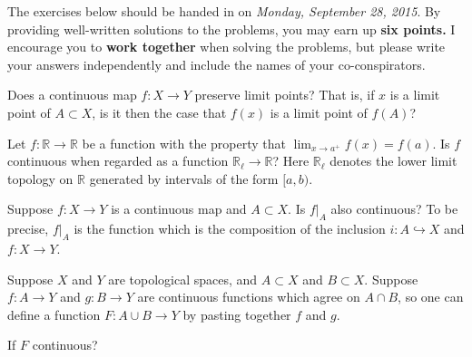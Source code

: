 \documentclass[12pt]{pset}
\author{Jim Fowler}
\date{Autumn 2015}
\newcommand{\RR}{\mathbb{R}}
\begin{document}
\maketitle

\noindent The exercises below should be handed in on \textit{Monday, September
  28, 2015}.  By providing well-written solutions to the problems, you
may earn up \textbf{six points.}  I encourage you to \textbf{work
  together} when solving the problems, but please write your answers
independently and include the names of your co-conspirators.

\begin{problem}

  Does a continuous map $f : X \to Y$ preserve limit points?  That is,
  if $x$ is a limit point of $A \subset X$, is it then the case that
  $f(x)$ is a limit point of $f(A)$?

\end{problem}

\begin{problem}

  Let $f : \RR \to \RR$ be a function with the property that
  $\lim_{x \to a^{+}} f(x) = f(a)$.  Is $f$ continuous when regarded
  as a function $\RR_\ell \to \RR$?  Here $\RR_\ell$ denotes the lower
  limit topology on $\RR$ generated by intervals of the form $[a,b)$.

\end{problem}

\begin{problem}

  Suppose $f : X \to Y$ is a continuous map and $A \subset X$.  Is
  $f |_A$ also continuous?  To be precise, $f|_A$ is the function
  which is the composition of the inclusion $i : A \hookrightarrow X$
  and $f : X \to Y$.

\end{problem}

\pagebreak

\begin{problem}
  
  Suppose $X$ and $Y$ are topological spaces, and $A \subset X$ and
  $B \subset X$.  Suppose $f : A \to Y$ and $g : B \to Y$ are
  continuous functions which agree on $A \cap B$, so one can define a
  function $F : A \cup B \to Y$ by pasting together $f$ and $g$.

  If $F$ continuous?

\end{problem}
\end{document}
